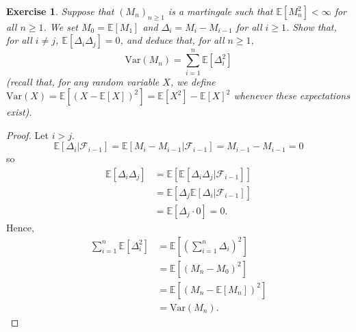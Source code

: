\documentclass{article}
\newtheorem{exercise}[theorem]{Exercise}
\begin{document}
\begin{exercise}
Suppose that $(M_n)_{n \geq 1}$ is a martingale such that $\mathbb{E}[M_n^2] < \infty$ for all $n \geq 1$. We set $M_0 = \mathbb{E}[M_1]$ and $\Delta_i = M_i - M_{i-1}$ for all $i \geq 1$. Show that, for all $i \neq j$, $\mathbb{E}[\Delta_i \Delta_j] = 0$, and deduce that, for all $n \geq 1$,
\[
\mathrm{Var}(M_n) = \sum_{i=1}^n \mathbb{E}[\Delta_i^2]
\]
(recall that, for any random variable $X$, we define $\mathrm{Var}(X) = \mathbb{E}[(X - \mathbb{E}[X])^2] = \mathbb{E}[X^2] - \mathbb{E}[X]^2$ whenever these expectations exist).
\end{exercise}
\begin{proof}
Let $i>j$. \[\mathbb{E}[\Delta_i|\mathcal{F}_{i-1}]=\mathbb{E}[M_i-M_{i-1}|\mathcal{F}_{i-1}]=M_{i-1}-M_{i-1}=0\] so\begin{align*}
\mathbb{E}[\Delta_i\Delta_j]&=\mathbb{E}[\mathbb{E}[\Delta_i\Delta_j|\mathcal{F}_{i-1}]]\\&=\mathbb{E}[\Delta_j\mathbb{E}[\Delta_i|\mathcal{F}_{i-1}]]\\&=\mathbb{E}[\Delta_j\cdot 0]=0.
\end{align*}
Hence,\begin{align*}
\sum_{i=1}^n\mathbb{E}[\Delta_i^2]&=\mathbb{E}\left[\left(\sum_{i=1}^n\Delta_i\right)^2\right]\\&=\mathbb{E}[(M_n-M_0)^2]\\&=\mathbb{E}[(M_n-\mathbb{E}[M_n])^2]\\&=\text{Var}(M_n).
\end{align*}
\end{proof}
\end{document}
